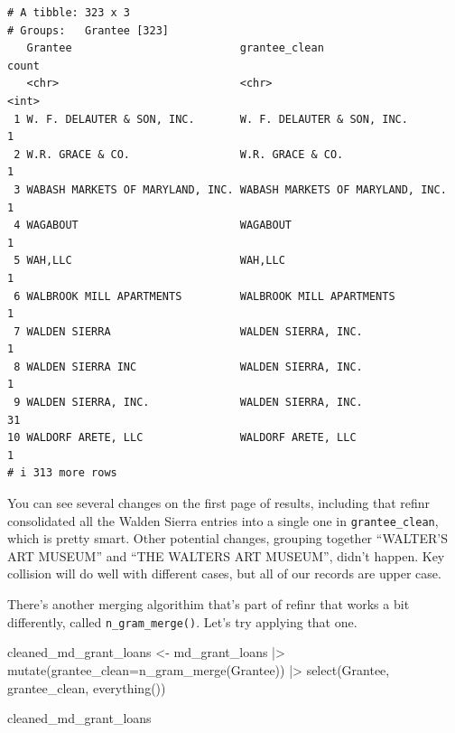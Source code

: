 \documentclass[
  letterpaper,
  DIV=11,
  numbers=noendperiod]{scrreprt}
\newenvironment{Shaded}{\begin{snugshade}}{\end{snugshade}}
\newcommand{\AttributeTok}[1]{\textcolor[rgb]{0.40,0.45,0.13}{#1}}
\newcommand{\FunctionTok}[1]{\textcolor[rgb]{0.28,0.35,0.67}{#1}}
\newcommand{\NormalTok}[1]{\textcolor[rgb]{0.00,0.23,0.31}{#1}}
\newcommand{\OtherTok}[1]{\textcolor[rgb]{0.00,0.23,0.31}{#1}}
\newcommand{\SpecialCharTok}[1]{\textcolor[rgb]{0.37,0.37,0.37}{#1}}
\begin{document}
\begin{verbatim}
# A tibble: 323 x 3
# Groups:   Grantee [323]
   Grantee                          grantee_clean                    count
   <chr>                            <chr>                            <int>
 1 W. F. DELAUTER & SON, INC.       W. F. DELAUTER & SON, INC.           1
 2 W.R. GRACE & CO.                 W.R. GRACE & CO.                     1
 3 WABASH MARKETS OF MARYLAND, INC. WABASH MARKETS OF MARYLAND, INC.     1
 4 WAGABOUT                         WAGABOUT                             1
 5 WAH,LLC                          WAH,LLC                              1
 6 WALBROOK MILL APARTMENTS         WALBROOK MILL APARTMENTS             1
 7 WALDEN SIERRA                    WALDEN SIERRA, INC.                  1
 8 WALDEN SIERRA INC                WALDEN SIERRA, INC.                  1
 9 WALDEN SIERRA, INC.              WALDEN SIERRA, INC.                 31
10 WALDORF ARETE, LLC               WALDORF ARETE, LLC                   1
# i 313 more rows
\end{verbatim}

You can see several changes on the first page of results, including that
refinr consolidated all the Walden Sierra entries into a single one in
\texttt{grantee\_clean}, which is pretty smart. Other potential changes,
grouping together ``WALTER'S ART MUSEUM'' and ``THE WALTERS ART
MUSEUM'', didn't happen. Key collision will do well with different
cases, but all of our records are upper case.

There's another merging algorithim that's part of refinr that works a
bit differently, called \texttt{n\_gram\_merge()}. Let's try applying
that one.

\begin{Shaded}
\begin{Highlighting}[]
\NormalTok{cleaned\_md\_grant\_loans }\OtherTok{\textless{}{-}}\NormalTok{ md\_grant\_loans }\SpecialCharTok{|\textgreater{}}
  \FunctionTok{mutate}\NormalTok{(}\AttributeTok{grantee\_clean=}\FunctionTok{n\_gram\_merge}\NormalTok{(Grantee)) }\SpecialCharTok{|\textgreater{}}
  \FunctionTok{select}\NormalTok{(Grantee, grantee\_clean, }\FunctionTok{everything}\NormalTok{())}

\NormalTok{cleaned\_md\_grant\_loans}
\end{Highlighting}
\end{Shaded}
\end{document}
